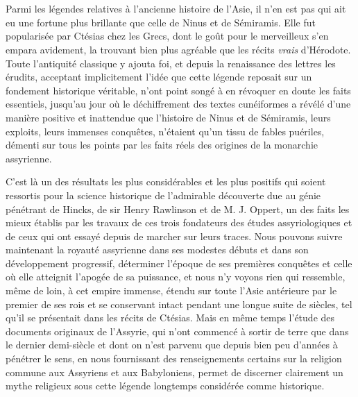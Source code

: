 \documentclass[a4paper, 11pt, oneside]{article}
\begin{document}
\section*{}
Parmi les légendes relatives à l'ancienne histoire de l'Asie, il n'en est pas qui ait eu une fortune plus brillante que celle de Ninus et de Sémiramis. Elle fut popularisée par Ctésias chez les Grecs, dont le goût pour le merveilleux s'en empara avidement, la trouvant bien plus agréable que les récits \emph{vrais} d'Hérodote. Toute l'antiquité classique y ajouta foi, et depuis la renaissance des lettres les érudits, acceptant implicitement l'idée que cette légende reposait sur un fondement historique véritable, n'ont point songé à en révoquer en doute les faits essentiels, jusqu'au jour où le déchiffrement des textes cunéiformes a révélé d'une manière positive et inattendue que l'histoire de Ninus et de Sémiramis, leurs exploits, leurs immenses conquêtes, n'étaient qu'un tissu de fables puériles, démenti sur tous les points par les faits réels des origines de la monarchie assyrienne.

C'est là un des résultats les plus considérables et les plus positifs qui soient ressortis pour la science historique de l'admirable découverte due au génie pénétrant de Hincks, de sir Henry Rawlinson et de M. J. Oppert, un des faits les mieux établis par les travaux de ces trois fondateurs des études assyriologiques et de ceux qui ont essayé depuis de marcher sur leurs traces. Nous pouvons suivre maintenant la royauté assyrienne dans ses modestes débuts et dans son développement progressif, déterminer l'époque de ses premières conquêtes et celle où elle atteignit l'apogée de sa puissance, et nous n'y voyons rien qui ressemble, même de loin, à cet empire immense, étendu sur toute l'Asie antérieure par le premier de ses rois et se conservant intact pendant une longue suite de siècles, tel qu'il se présentait dans les récits de Ctésias. Mais en même temps l'étude des documents originaux de l'Assyrie, qui n'ont commencé à sortir de terre que dans le dernier demi-siècle et dont on n'est parvenu que depuis bien peu d'années à pénétrer le sens, en nous fournissant des renseignements certains sur la religion commune aux Assyriens et aux Babyloniens, permet de discerner clairement un mythe religieux sous cette légende longtemps considérée comme historique.
\end{document}

